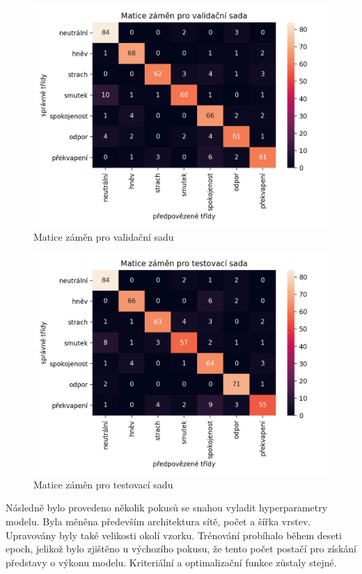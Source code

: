 \documentclass[FM,BP]{tulthesis}
\begin{document}
\begin{figure}[!htbp]
\centerline{\includegraphics[scale=.5]{baseline-conf_matrix-val.png}}
\caption{Matice záměn pro validační sadu}
\label{fig}
\end{figure}
\FloatBarrier

\begin{figure}[!htbp]
\centerline{\includegraphics[scale=.5]{baseline-conf_matrix-test.png}}
\caption{Matice záměn pro testovací sadu}
\label{fig}
\end{figure}
\FloatBarrier

Následně bylo provedeno několik pokusů se snahou vyladit hyperparametry modelu. Byla měněna především architektura sítě, počet a šířka vrstev. Upravovány byly také velikosti okolí vzorku. Trénování probíhalo během deseti epoch, jelikož bylo zjištěno u výchozího pokusu, že tento počet postačí pro získání představy o výkonu modelu. Kriteriální a optimalizační funkce zůstaly stejné.
\end{document}
